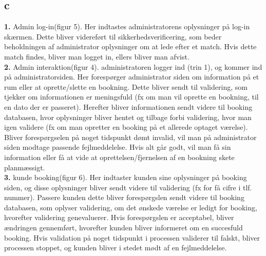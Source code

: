 \documentclass[12pt,a4paper]{article}
\begin{document}
\subsection{c}
\textbf{1.} Admin log-in(figur 5). Her indtastes administratorens oplysninger på log-in skærmen. Dette bliver 	videreført til sikkerhedsverificering, som beder beholdningen af administrator oplysninger 	om at lede efter et match. Hvis dette match findes, bliver man logget in, ellers bliver man 	afvist. \\
	\textbf{2.} Admin interaktion(figur 4). administratoren logger ind (trin 1), og kommer ind på 	administratorsiden. Her forespørger administrator siden om information på et rum eller at 	oprette/slette en bookning. Dette bliver sendt til validering, som tjekker om informationen er 	meningsfuld (fx om man vil oprette en bookning, til en dato der er passeret). Herefter bliver 	informationen sendt videre til booking databasen, hvor oplysninger bliver hentet og tilbage 	forbi validering, hvor man igen validere (fx om man opretter en booking på et allerede 	optaget værelse). Bliver forespørgselen på noget tidspunkt dømt invalid, vil man på 	administrator siden modtage passende fejlmeddelelse. Hvis alt går godt, vil man få sin 	information eller få at vide at oprettelsen/fjernelsen af en bookning skete planmæssigt.\\
	\textbf{3.} kunde booking(figur 6). Her indtaster kunden sine oplysninger på booking siden, og disse 	oplysninger bliver sendt videre til validering (fx for få cifre i tlf. nummer). Passere kunden 	dette bliver forespørgslen sendt videre til booking databasen, som oplyser validering, om det 	ønskede værelse er ledigt for booking, hvorefter validering genevaluerer. Hvis forespørgslen 	er acceptabel, bliver ændringen gennemført, hvorefter kunden bliver informeret om en 		succesfuld booking. Hvis validation på noget tidspunkt i processen validerer til falskt, bliver 	processen stoppet, og kunden bliver i stedet mødt af en fejlmeddelelse.
\end{document}
